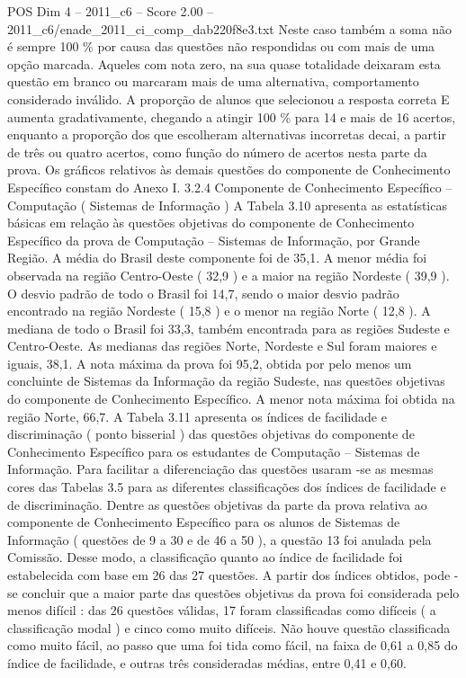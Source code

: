 \begin{textsample}{POS Dim 4 – 2011\_c6 – Score 2.00 – 2011\_c6/enade\_2011\_ci\_comp\_dab220f8e3.txt}
Neste caso também a soma não é sempre 100 \% por causa das questões não respondidas ou com mais de uma opção marcada.
Aqueles com nota zero, na sua quase totalidade deixaram esta questão em branco ou marcaram mais de uma alternativa, comportamento considerado inválido.
A proporção de alunos que selecionou a resposta correta E aumenta gradativamente, chegando a atingir 100 \% para 14 e mais de 16 acertos, enquanto a proporção dos que escolheram alternativas incorretas decai, a partir de três ou quatro acertos, como função do número de acertos nesta parte da prova.
Os gráficos relativos às demais questões do componente de Conhecimento Específico constam do Anexo I. 3.2.4 Componente de Conhecimento Específico – Computação ( Sistemas de Informação ) A Tabela 3.10 apresenta as estatísticas básicas em relação às questões objetivas do componente de Conhecimento Específico da prova de Computação – Sistemas de Informação, por Grande Região.
A média do Brasil deste componente foi de 35,1.
A menor média foi observada na região Centro-Oeste ( 32,9 ) e a maior na região Nordeste ( 39,9 ).
O desvio padrão de todo o Brasil foi 14,7, sendo o maior desvio padrão encontrado na região Nordeste ( 15,8 ) e o menor na região Norte ( 12,8 ).
A mediana de todo o Brasil foi 33,3, também encontrada para as regiões Sudeste e Centro-Oeste.
As medianas das regiões Norte, Nordeste e Sul foram maiores e iguais, 38,1.
A nota máxima da prova foi 95,2, obtida por pelo menos um concluinte de Sistemas da Informação da região Sudeste, nas questões objetivas do componente de Conhecimento Específico.
A menor nota máxima foi obtida na região Norte, 66,7.
A Tabela 3.11 apresenta os índices de facilidade e discriminação ( ponto bisserial ) das questões objetivas do componente de Conhecimento Específico para os estudantes de Computação – Sistemas de Informação.
Para facilitar a diferenciação das questões usaram -se as mesmas cores das Tabelas 3.5 para as diferentes classificações dos índices de facilidade e de discriminação.
Dentre as questões objetivas da parte da prova relativa ao componente de Conhecimento Específico para os alunos de Sistemas de Informação ( questões de 9 a 30 e de 46 a 50 ), a questão 13 foi anulada pela Comissão.
Desse modo, a classificação quanto ao índice de facilidade foi estabelecida com base em 26 das 27 questões.
A partir dos índices obtidos, pode -se concluir que a maior parte das questões objetivas da prova foi considerada pelo menos difícil : das 26 questões válidas, 17 foram classificadas como difíceis ( a classificação modal ) e cinco como muito difíceis.
Não houve questão classificada como muito fácil, ao passo que uma foi tida como fácil, na faixa de 0,61 a 0,85 do índice de facilidade, e outras três consideradas médias, entre 0,41 e 0,60.

\end{textsample}
